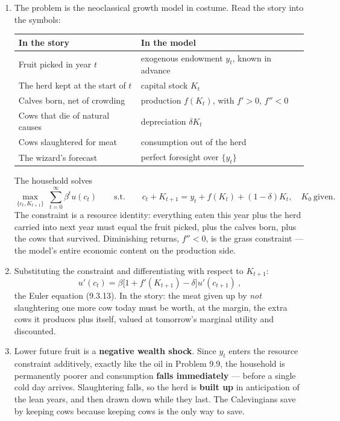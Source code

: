 \documentclass[12pt, letterpaper]{article}
\begin{document}
\begin{tcolorbox}[evenbox,title={Problem 9.10 \quad Wizards and Cows}]
\begin{enumerate}
\item The problem is the neoclassical growth model in costume. Read the story into the symbols:
\begin{center}
\begin{tabular}{@{}ll@{}}
\toprule
\textbf{In the story} & \textbf{In the model} \\
\midrule
Fruit picked in year $t$ & exogenous endowment $y_t$, known in advance \\
The herd kept at the start of $t$ & capital stock $K_t$ \\
Calves born, net of crowding & production $f(K_t)$, with $f'>0$, $f''<0$ \\
Cows that die of natural causes & depreciation $\delta K_t$ \\
Cows slaughtered for meat & consumption out of the herd \\
The wizard's forecast & perfect foresight over $\{y_t\}$ \\
\bottomrule
\end{tabular}
\end{center}
The household solves
\[
\max_{\{c_t,K_{t+1}\}}\ \sum_{t=0}^{\infty}\beta^t u(c_t)
\qquad\text{s.t.}\qquad
c_t+K_{t+1}=y_t+f(K_t)+(1-\delta)K_t,\quad K_0\ \text{given}.
\]
The constraint is a resource identity: everything eaten this year plus the herd carried into
next year must equal the fruit picked, plus the calves born, plus the cows that survived.
Diminishing returns, $f''<0$, is the grass constraint --- the model's entire economic content on
the production side.

\item Substituting the constraint and differentiating with respect to $K_{t+1}$:
\[
\boxed{\ u'(c_t)=\beta\Big[1+f'(K_{t+1})-\delta\Big]u'(c_{t+1})\ },
\]
the Euler equation (9.3.13). In the story: the meat given up by \emph{not} slaughtering one more
cow today must be worth, at the margin, the extra cows it produces plus itself, valued at
tomorrow's marginal utility and discounted.

\item Lower future fruit is a \textbf{negative wealth shock}. Since $y_t$ enters the resource
constraint additively, exactly like the oil in Problem 9.9, the household is permanently poorer
and consumption \textbf{falls immediately} --- before a single cold day arrives. Slaughtering
falls, so the herd is \textbf{built up} in anticipation of the lean years, and then drawn down
while they last. The Calevingians save by keeping cows because keeping cows is the only way to
save.


\end{enumerate}
\end{tcolorbox}
\end{document}
